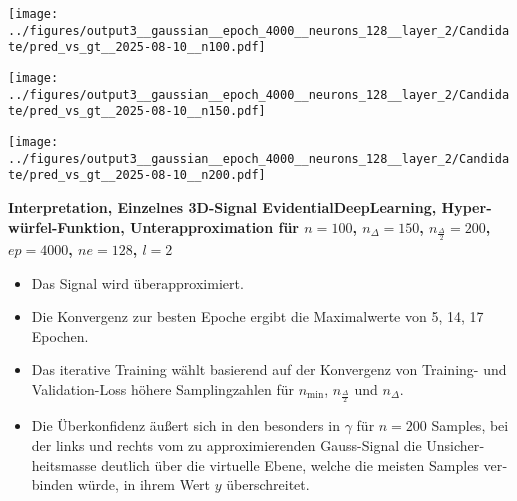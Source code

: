 \begin{otherlanguage}{ngerman}
\begin{samepage}
\begin{minipage}{\textwidth}
\vspace{0.125cm}

\begin{minipage}{0.05\textwidth}
    \centering{}
\end{minipage}%
\begin{minipage}{0.3\textwidth}
    \centering
    \texttt{[image: ../figures/output3\_\_gaussian\_\_epoch\_4000\_\_neurons\_128\_\_layer\_2/Candidate/pred\_vs\_gt\_\_2025-08-10\_\_n100.pdf]}
\end{minipage}%
\begin{minipage}{0.3\textwidth}
    \centering
    \texttt{[image: ../figures/output3\_\_gaussian\_\_epoch\_4000\_\_neurons\_128\_\_layer\_2/Candidate/pred\_vs\_gt\_\_2025-08-10\_\_n150.pdf]}
\end{minipage}%
\begin{minipage}{0.3\textwidth}
    \centering
    \texttt{[image: ../figures/output3\_\_gaussian\_\_epoch\_4000\_\_neurons\_128\_\_layer\_2/Candidate/pred\_vs\_gt\_\_2025-08-10\_\_n200.pdf]}
\end{minipage}

\label{fig:pred_vs_gt_matrix}

\end{minipage}
\end{samepage}



\clearpage

\begin{samepage}
\begin{minipage}{\textwidth}

\noindent\textbf{Interpretation, Einzelnes 3D-Signal \gls{EvidentialDeepLearning}, Hyperwürfel-Funktion,
Unterapproximation für $n=100$, $n_{\Delta}=150$, $n_{\frac{\Delta}{2}}=200$, $ep=4000$, $ne=128$, $l=2$}

\begin{itemize}
    \item Das Signal wird überapproximiert.
    \item Die Konvergenz zur besten Epoche ergibt die Maximalwerte von 5, 14, 17 Epochen.
    \item Das iterative Training wählt basierend auf der Konvergenz von Training- und Validation-Loss höhere Samplingzahlen für $n_{\min}$, $n_{\frac{\Delta}{2}}$ und $n_{\Delta}$.
    \item Die Überkonfidenz äußert sich in den besonders in $\gamma$ für $n=200$ Samples, bei der links und rechts vom zu approximierenden Gauss-Signal die Unsicherheitsmasse deutlich über die virtuelle Ebene, welche die meisten Samples verbinden würde, in ihrem Wert $y$ überschreitet.
\end{itemize}





\end{minipage}
\end{samepage}
\end{otherlanguage}
